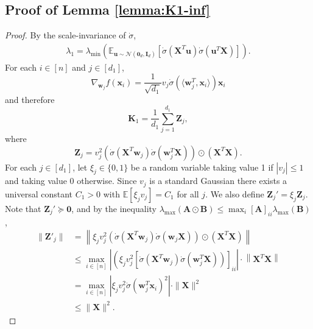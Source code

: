 \documentclass{article}
\theoremstyle{definition}
\newcommand{\E}{\mathbb{E}}
\newcommand{\mc}{\mathcal}
\def\vu{{\bm{u}}}
\def\vw{{\bm{w}}}
\def\vx{{\bm{x}}}
\def\mA{{\bm{A}}}
\def\mB{{\bm{B}}}
\def\mI{{\bm{I}}}
\def\mK{{\bm{K}}}
\def\mX{{\bm{X}}}
\def\mZ{{\bm{Z}}}
\begin{document}
\subsection{Proof of Lemma \ref{lemma:K1-inf}} \label{app:lemma:K1-inf}
\lemmaKOneinf*
\begin{proof}
    By the scale-invariance of $\dot{\sigma}$,
    \begin{align*}
        \lambda_1 = \lambda_{\min}\left(\E_{\vu \sim  \mc{N}(\bm{0}_d, \mI_d) } \left[\dot{\sigma}\left(\mX^T \vu \right)\dot{\sigma}\left(\vu^T\mX\right) \right] \right).
    \end{align*}
    For each $i \in [n]$ and $j \in [d_1]$,
    \[\nabla_{\vw_j}f(\vx_i) = \frac{1}{\sqrt{d_1}} v_j \dot{\sigma}\left(\langle \vw_j^T, \vx_i \rangle\right) \vx_i \]
    and therefore
    \[\mK_1 = \frac{1}{d_1}\sum_{j = 1}^{d_1} \mZ_j, \]
    where
    \[\mZ_j = v_j^2 \left(\dot{\sigma}\left( \mX^T \vw_j \right) \dot{\sigma}\left(\vw_j^T \mX\right)\right) \odot \left(\mX^T \mX\right). \]
    For each $j \in [d_1]$, let $\xi_j \in \{0, 1\}$ be a random variable taking value 1 if $|v_j| \leq 1$ and taking value 0 otherwise. Since $v_j$ is a standard Gaussian there exists a universal constant $C_1 > 0$ with $\E[\xi_jv_j] = C_1$ for all $j$.
    We also define $\mZ_j' = \xi_j \mZ_j$. Note that $\mZ_j' \succeq \bm{0}$, and by the inequality $\lambda_{\max}(\mA \odot \mB) \leq \max_i [\mA]_{ii} \lambda_{\max}(\mB)$,
    \begin{align*}
        \|\mZ'_j\| &= \left\|\xi_jv_j^2 \left(\dot{\sigma}\left( \mX^T \vw_j \right) \dot{\sigma}\left(\vw_j \mX\right)\right) \odot \left(\mX^T \mX\right)  \right\|\\
        &\leq \max_{i \in [n]}\left|\left(\xi_jv_j^2 \left[\dot{\sigma}\left(\mX^T \vw_j \right) \dot{\sigma}\left(\vw_j^T \mX\right)\right)\right]_{ii} \right| \cdot \left\| \mX^T \mX\right\|\\
        &= \max_{i \in [n]} \left|\xi_j v_j^2 \dot{\sigma}\left(\vw_j^T \vx_i \right)^2 \right| \cdot \|\mX\|^2\\
        &\leq \|\mX\|^2.
    \end{align*}


\end{proof}
\end{document}
